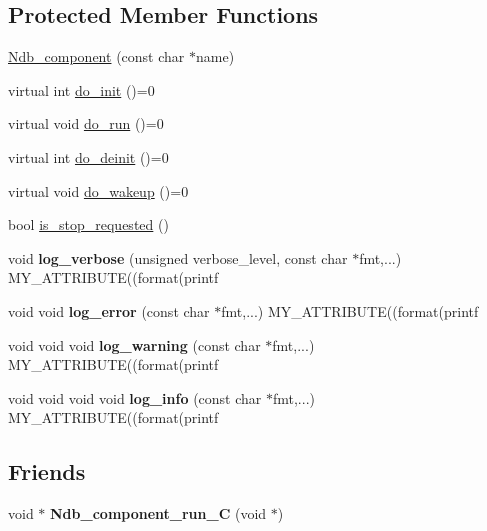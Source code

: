 \subsection*{Protected Member Functions}
\begin{DoxyCompactItemize}
\item 
\mbox{\hyperlink{classNdb__component_ad12d0d1f27286955b4d5df258abdb696}{Ndb\+\_\+component}} (const char $\ast$name)
\item 
virtual int \mbox{\hyperlink{classNdb__component_aa9e189140a854ec9dc044ba61f66cffb}{do\+\_\+init}} ()=0
\item 
virtual void \mbox{\hyperlink{classNdb__component_a4a67d55b4657f82d2e65de8cfd54e541}{do\+\_\+run}} ()=0
\item 
virtual int \mbox{\hyperlink{classNdb__component_abb9ab4eb1e2451914a7ba29a4511479c}{do\+\_\+deinit}} ()=0
\item 
virtual void \mbox{\hyperlink{classNdb__component_a2fd060c1bfaa3c3e4771a1f5a2090e56}{do\+\_\+wakeup}} ()=0
\item 
bool \mbox{\hyperlink{classNdb__component_afad79804c86f06145a1578094ffcb69d}{is\+\_\+stop\+\_\+requested}} ()
\item 
\mbox{\label{classNdb__component_ab8ebcfe1856707eb11f6750c76651e04}} 
void {\bfseries log\+\_\+verbose} (unsigned verbose\+\_\+level, const char $\ast$fmt,...) M\+Y\+\_\+\+A\+T\+T\+R\+I\+B\+U\+TE((format(printf
\item 
\mbox{\label{classNdb__component_a1ab09ed7b94cb6f028a32da182a686aa}} 
void void {\bfseries log\+\_\+error} (const char $\ast$fmt,...) M\+Y\+\_\+\+A\+T\+T\+R\+I\+B\+U\+TE((format(printf
\item 
\mbox{\label{classNdb__component_aad5c3999a0fd8aa7ec1b14af59382380}} 
void void void {\bfseries log\+\_\+warning} (const char $\ast$fmt,...) M\+Y\+\_\+\+A\+T\+T\+R\+I\+B\+U\+TE((format(printf
\item 
\mbox{\label{classNdb__component_a1cb05b361e24c5df938e0a790d8d4790}} 
void void void void {\bfseries log\+\_\+info} (const char $\ast$fmt,...) M\+Y\+\_\+\+A\+T\+T\+R\+I\+B\+U\+TE((format(printf
\end{DoxyCompactItemize}
\subsection*{Friends}
\begin{DoxyCompactItemize}
\item 
\mbox{\label{classNdb__component_a713c3e527d3116a112333cb3618efa57}} 
void $\ast$ {\bfseries Ndb\+\_\+component\+\_\+run\+\_\+C} (void $\ast$)
\end{DoxyCompactItemize}


